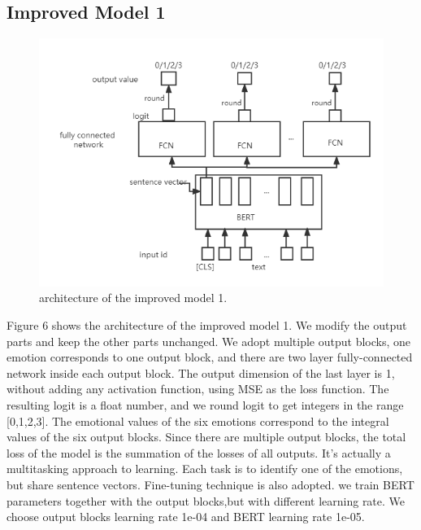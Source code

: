 \documentclass[12pt,twocolumn,letterpaper]{article}
\begin{document}
\subsection{Improved Model 1}
\begin{figure}
\begin{center}
\includegraphics[scale=0.5]{Method2.png}
\end{center}
   \caption{architecture of the improved model 1.}
\label{fig:short}
\end{figure}

Figure 6 shows the architecture of the improved model 1. We modify the output parts and keep the other parts unchanged. We adopt multiple output blocks, one emotion corresponds to one output block, and there are two layer fully-connected network inside each output block. The output dimension of the last layer is 1, without adding any activation function, using MSE as the loss function.  The resulting logit is a float number, and we round logit to get integers in the range [0,1,2,3]. The emotional values of the six emotions correspond to the integral values of the six output blocks. Since there are multiple output blocks, the total loss of the model is the summation of the losses of all outputs.  It's actually a multitasking approach to learning. Each task is to identify one of the emotions, but share sentence vectors.
Fine-tuning technique is also adopted. we train BERT parameters together with the output blocks,but with different learning rate. We choose output blocks learning rate 1e-04 and BERT learning rate 1e-05.
\end{document}
